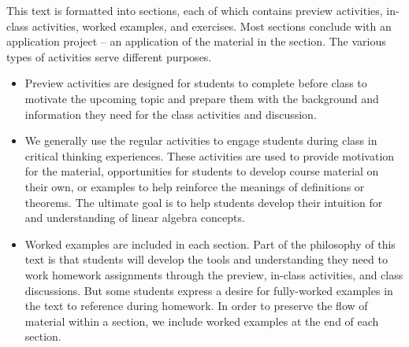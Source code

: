 \label{sec:pref_layout}

This text is formatted into sections, each of which contains preview activities, in-class activities, worked examples, and exercises. Most sections conclude with an application project -- an application of the material in the section. The various types of activities serve different purposes.
\begin{itemize}
\item Preview activities are designed for students to complete before class to motivate the upcoming topic and prepare them with the background and information they need for the class activities and discussion.
\item We generally use the regular activities to engage students during class in critical thinking experiences. These activities are used to provide motivation for the material, opportunities for students to develop course material on their own, or examples to help reinforce the meanings of definitions or theorems. The ultimate goal is to help students develop their intuition for and understanding of linear algebra concepts. 
\item Worked examples are included in each section. Part of the philosophy of this text is that students will develop the tools and understanding they need to work homework assignments through the preview, in-class activities, and class discussions. But some students express a desire for fully-worked examples in the text to reference during homework. In order to preserve the flow of material within a section, we include worked examples at the end of each section.  

\end{itemize}

